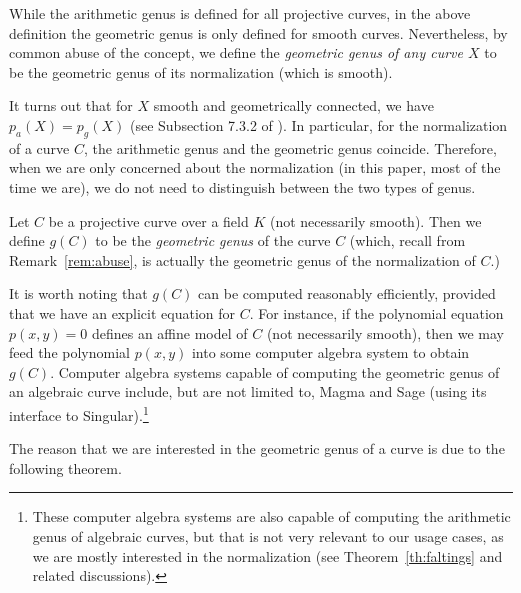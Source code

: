 \begin{remark}
  \label{rem:abuse}
  While the arithmetic genus is defined for all projective curves, in
  the above definition the geometric genus is only defined for smooth
  curves. Nevertheless, by common abuse of the concept, we define the
  \emph{geometric genus of any curve $X$} to be the geometric genus of
  its normalization (which is smooth).
\end{remark}

It turns out that for $X$ smooth and geometrically connected, we have
$p_a(X) = p_g(X)$ (see Subsection 7.3.2 of \cite{MR1917232}). In
particular, for the normalization of a curve $C$, the arithmetic genus
and the geometric genus coincide. Therefore, when we are only
concerned about the normalization (in this paper, most of the time we
are), we do not need to distinguish between the two types of genus.

\begin{definition}
  Let $C$ be a projective curve over a field $K$ (not necessarily
  smooth). Then we define $g(C)$ to be the \emph{geometric genus} of
  the curve $C$ (which, recall from Remark~\ref{rem:abuse}, is
  actually the geometric genus of the normalization of $C$.)
\end{definition}

\begin{remark}
  It is worth noting that $g(C)$ can be computed reasonably
  efficiently, provided that we have an explicit equation for $C$. For
  instance, if the polynomial equation $p(x, y) = 0$ defines an affine
  model of $C$ (not necessarily smooth), then we may feed the
  polynomial $p(x, y)$ into some computer algebra system to obtain
  $g(C)$. Computer algebra systems capable of computing the geometric
  genus of an algebraic curve include, but are not limited to, Magma
  and Sage (using its interface to Singular).\footnote{%
    These computer algebra systems are also capable of computing the
    arithmetic genus of algebraic curves, but that is not very
    relevant to our usage cases, as we are mostly interested in the
    normalization (see Theorem~\ref{th:faltings} and related
    discussions).}
\end{remark}

The reason that we are interested in the geometric genus of a curve is
due to the following theorem.

